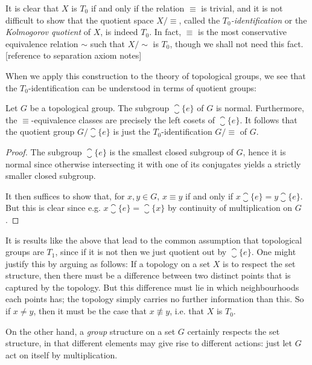 \documentclass[article, a4paper, 11pt, oneside]{memoir}
\numberwithin{equation}{chapter}
\begin{document}
It is clear that $X$ is $T_0$ if and only if the relation $\equiv$ is trivial, and it is not difficult to show that the quotient space $X/{\equiv}$, called the \emph{$T_0$-identification} or the \emph{Kolmogorov quotient} of $X$, is indeed $T_0$. In fact, $\equiv$ is the most conservative equivalence relation $\sim$ such that $X/{\sim}$ is $T_0$, though we shall not need this fact. [reference to separation axiom notes]

When we apply this construction to the theory of topological groups, we see that the $T_0$-identification can be understood in terms of quotient groups:

\begin{proposition}
    \label{thm:quotient-group-T0-identification}
    Let $G$ be a topological group. The subgroup $\closure{\{e\}}$ of $G$ is normal. Furthermore, the $\equiv$-equivalence classes are precisely the left cosets of $\closure{\{e\}}$. It follows that the quotient group $G / \closure{\{e\}}$ is just the $T_0$-identification $G/{\equiv}$ of $G$.
\end{proposition}

\begin{proof}
    The subgroup $\closure{\{e\}}$ is the smallest closed subgroup of $G$, hence it is normal since otherwise intersecting it with one of its conjugates yields a strictly smaller closed subgroup.

    It then suffices to show that, for $x,y \in G$, $x \equiv y$ if and only if $x \closure{\{e\}} = y \closure{\{e\}}$. But this is clear since e.g. $x \closure{\{e\}} = \closure{\{x\}}$ by continuity of multiplication on $G$.
\end{proof}

It is results like the above that lead to the common assumption that topological groups are $T_1$, since if it is not then we just quotient out by $\closure{\{e\}}$. One might justify this by arguing as follows: If a topology on a set $X$ is to respect the set structure, then there must be a difference between two distinct points that is captured by the topology. But this difference must lie in which neighbourhoods each points has; the topology simply carries no further information than this. So if $x \neq y$, then it must be the case that $x \not\equiv y$, i.e. that $X$ is $T_0$.

On the other hand, a \emph{group} structure on a set $G$ certainly respects the set structure, in that different elements may give rise to different actions: just let $G$ act on itself by multiplication.
\end{document}
